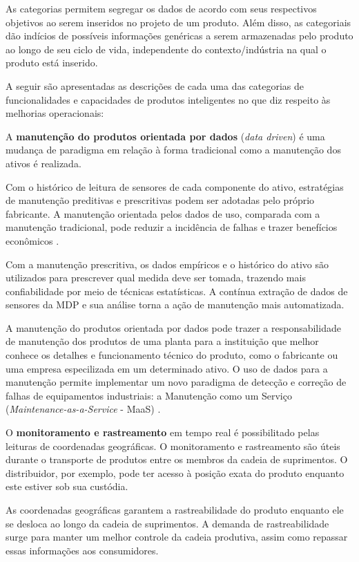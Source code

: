 	As categorias permitem segregar os dados de acordo com seus respectivos objetivos ao serem inseridos no projeto de um produto. Além disso, as categoriais dão indícios de possíveis informações genéricas a serem armazenadas pelo produto ao longo de seu ciclo de vida, independente do contexto/indústria na qual o produto está inserido.
	
	A seguir são apresentadas as descrições de cada uma das categorias de funcionalidades e capacidades de produtos inteligentes no que diz respeito às melhorias operacionais:
	
	A \textbf{manutenção do produtos orientada por dados} (\textit{data driven})  é uma mudança de paradigma em relação à forma tradicional como a manutenção dos ativos é realizada.
	
	Com o histórico de leitura de sensores de cada componente do ativo, estratégias de manutenção preditivas e prescritivas podem ser adotadas pelo próprio fabricante. A manutenção orientada pelos dados de uso, comparada com a manutenção tradicional, pode reduzir a incidência de falhas e trazer benefícios econômicos \cite{odonovan2015maintenance}.
	
	Com a manutenção prescritiva, os dados empíricos e o histórico do ativo são utilizados para prescrever qual medida deve ser tomada, trazendo mais confiabilidade por meio de técnicas estatísticas. A contínua extração de dados de sensores da MDP e sua análise torna a ação de manutenção mais automatizada.
	
	A manutenção do produtos orientada por dados pode trazer a responsabilidade de manutenção dos produtos de uma planta para a instituição que melhor conhece os detalhes e funcionamento técnico do produto, como o fabricante ou uma empresa especilizada em um determinado ativo. O uso de dados para a manutenção permite implementar um novo paradigma de detecção e correção de falhas de equipamentos industriais: a Manutenção como um Serviço (\textit{Maintenance-as-a-Service} - MaaS)  \cite{zoll2018maas}.

	O \textbf{monitoramento e rastreamento} em tempo real é possibilitado pelas leituras de coordenadas geográficas. O monitoramento e rastreamento são úteis durante o transporte de produtos entre os membros da cadeia de suprimentos. O distribuidor, por exemplo, pode ter acesso à posição exata do produto enquanto este estiver sob sua custódia.
	
	As coordenadas geográficas garantem a rastreabilidade do produto enquanto ele se desloca ao longo da cadeia de suprimentos. A demanda de rastreabilidade surge para manter um melhor controle da cadeia produtiva, assim como repassar essas informações aos consumidores.
	
